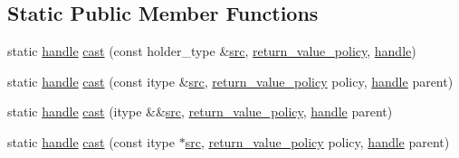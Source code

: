 \subsection*{Static Public Member Functions}
\begin{DoxyCompactItemize}
\item 
static \mbox{\hyperlink{classhandle}{handle}} \mbox{\hyperlink{structcopyable__holder__caster_a5b09fa5941d46a4fdedbbb631418a89b}{cast}} (const holder\+\_\+type \&\mbox{\hyperlink{_s_d_l__opengl__glext_8h_a72e0fdf0f845ded60b1fada9e9195cd7}{src}}, \mbox{\hyperlink{detail_2common_8h_adde72ab1fb0dd4b48a5232c349a53841}{return\+\_\+value\+\_\+policy}}, \mbox{\hyperlink{classhandle}{handle}})
\item 
static \mbox{\hyperlink{classhandle}{handle}} \mbox{\hyperlink{structcopyable__holder__caster_acd5bd2fafc86fb3160c7955bfc2f88de}{cast}} (const itype \&\mbox{\hyperlink{_s_d_l__opengl__glext_8h_a72e0fdf0f845ded60b1fada9e9195cd7}{src}}, \mbox{\hyperlink{detail_2common_8h_adde72ab1fb0dd4b48a5232c349a53841}{return\+\_\+value\+\_\+policy}} policy, \mbox{\hyperlink{classhandle}{handle}} parent)
\item 
static \mbox{\hyperlink{classhandle}{handle}} \mbox{\hyperlink{structcopyable__holder__caster_abd0cc8e51c0882bb1b81710745295811}{cast}} (itype \&\&\mbox{\hyperlink{_s_d_l__opengl__glext_8h_a72e0fdf0f845ded60b1fada9e9195cd7}{src}}, \mbox{\hyperlink{detail_2common_8h_adde72ab1fb0dd4b48a5232c349a53841}{return\+\_\+value\+\_\+policy}}, \mbox{\hyperlink{classhandle}{handle}} parent)
\item 
static \mbox{\hyperlink{classhandle}{handle}} \mbox{\hyperlink{structcopyable__holder__caster_a0fa8012ef36eabd7993fdd3adb4fbf92}{cast}} (const itype $\ast$\mbox{\hyperlink{_s_d_l__opengl__glext_8h_a72e0fdf0f845ded60b1fada9e9195cd7}{src}}, \mbox{\hyperlink{detail_2common_8h_adde72ab1fb0dd4b48a5232c349a53841}{return\+\_\+value\+\_\+policy}} policy, \mbox{\hyperlink{classhandle}{handle}} parent)
\end{DoxyCompactItemize}
